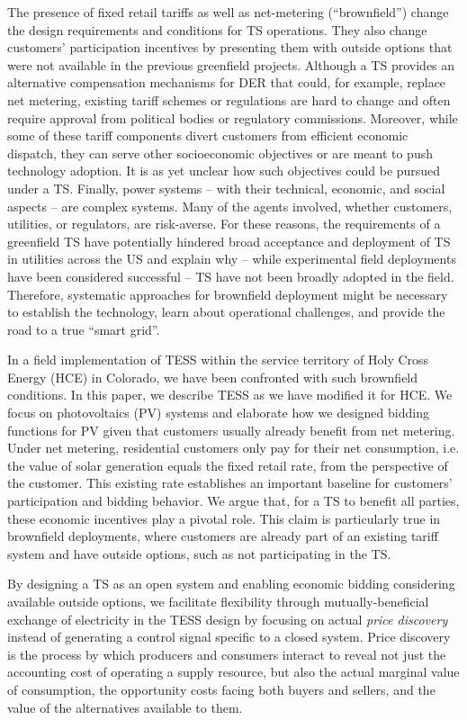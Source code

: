 The presence of fixed retail tariffs as well as net-metering (``brownfield'') change the design requirements and conditions for TS operations. They also change customers' participation incentives by presenting them with outside options that were not available in the previous greenfield projects. 
Although a TS provides an alternative compensation mechanisms for DER that could, for example, replace net metering, existing tariff schemes or regulations are hard to change and often require approval from political bodies or regulatory commissions. 
Moreover, while some of these tariff components divert customers from efficient economic dispatch, they can serve other socioeconomic objectives or are meant to push technology adoption. It is as yet unclear how such objectives could be pursued under a TS.
Finally, power systems -- with their technical, economic, and social aspects -- are complex systems. Many of the agents involved, whether customers, utilities, or regulators, are risk-averse. 
For these reasons, the requirements of a greenfield TS have potentially hindered broad acceptance and deployment of TS in utilities across the US and explain why -- while experimental field deployments have been considered successful -- TS have not been broadly adopted in the field.
Therefore, systematic approaches for brownfield deployment might be necessary to establish the technology, learn about operational challenges, and provide the road to a true ``smart grid''.



In a field implementation of TESS within the service territory of Holy Cross Energy (HCE) in Colorado, we have been confronted with such brownfield conditions.
In this paper, we describe TESS as we have modified it for HCE. We focus on photovoltaics (PV) systems and elaborate how we designed bidding functions for PV given that customers usually already benefit from net metering. Under net metering, residential customers only pay for their net consumption, i.e. the value of solar generation equals the fixed retail rate, from the perspective of the customer.
This existing rate establishes an important baseline for customers' participation and bidding behavior.
We argue that, for a TS to benefit all parties, these economic incentives play a pivotal role. This claim is particularly true in brownfield deployments, where customers are already part of an existing tariff system and have outside options, such as not participating in the TS.

By designing a TS as an open system and enabling economic bidding considering available outside options, we facilitate flexibility through mutually-beneficial exchange of electricity in the TESS design by focusing on actual \emph{price discovery} instead of generating a control signal specific to a closed system. Price discovery is the process by which producers and consumers interact to reveal not just the accounting cost of operating a supply resource, but also the actual marginal value of consumption, the opportunity costs facing both buyers and sellers, and the value of the alternatives available to them.  

